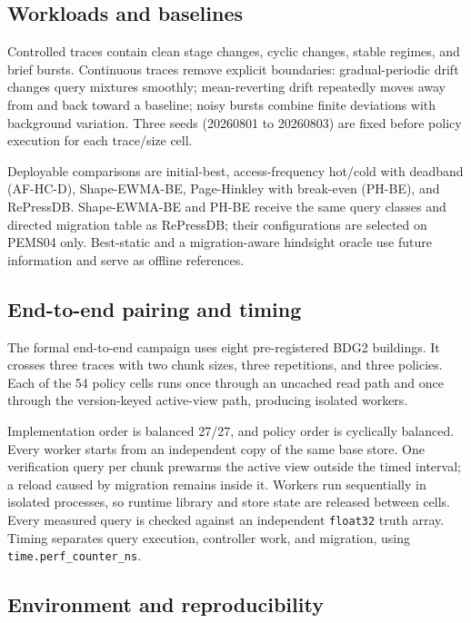 \documentclass[final,5p,times,twocolumn,authoryear]{elsarticle}
\begin{document}
\subsection{Workloads and baselines}

Controlled traces contain clean stage changes, cyclic changes, stable regimes, and brief bursts. Continuous traces remove explicit boundaries: gradual-periodic drift changes query mixtures smoothly; mean-reverting drift repeatedly moves away from and back toward a baseline; noisy bursts combine finite deviations with background variation. Three seeds (20260801 to 20260803) are fixed before policy execution for each trace/size cell.

Deployable comparisons are initial-best, access-frequency hot/cold with deadband (AF-HC-D), Shape-EWMA-BE, Page-Hinkley with break-even (PH-BE), and RePressDB. Shape-EWMA-BE and PH-BE receive the same query classes and directed migration table as RePressDB; their configurations are selected on PEMS04 only. Best-static and a migration-aware hindsight oracle use future information and serve as offline references.

\subsection{End-to-end pairing and timing}

The formal end-to-end campaign uses eight pre-registered BDG2 buildings. It crosses three traces with two chunk sizes, three repetitions, and three policies. Each of the 54 policy cells runs once through an uncached read path and once through the version-keyed active-view path, producing \EndToEndWorkers{} isolated workers.

Implementation order is balanced 27/27, and policy order is cyclically balanced. Every worker starts from an independent copy of the same base store. One verification query per chunk prewarms the active view outside the timed interval; a reload caused by migration remains inside it. Workers run sequentially in isolated processes, so runtime library and store state are released between cells. Every measured query is checked against an independent \texttt{float32} truth array. Timing separates query execution, controller work, and migration, using \texttt{time.perf\_counter\_ns}.

\subsection{Environment and reproducibility}
\end{document}
